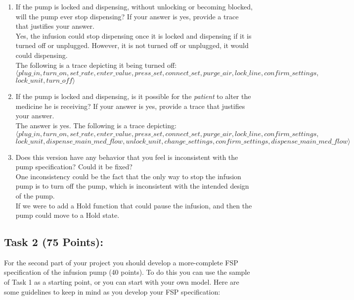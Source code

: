 \documentclass{article}
\newcommand{\head}{\subsection*}
\begin{document}
\begin{enumerate}
  
\item If the pump is locked and dispensing, without unlocking or becoming blocked, will the pump ever stop dispensing? If your answer is yes, provide a trace that justifies your answer. \\
Yes, the infusion could stop dispensing once it is locked and dispensing if it is turned off or unplugged. However, it is not turned off or unplugged, it would could dispensing.\\
The following is a trace depicting it being turned off:\\

$\langle plug\_in, turn\_on, set\_rate, enter\_value, press\_set, connect\_set, purge\_air, lock\_line, confirm\_settings,$\\
$lock\_unit, turn\_off \rangle$
  
\item If the pump is locked and dispensing, is it possible for the \emph{patient} to alter the medicine he is receiving? If your answer is yes, provide a trace that justifies your answer.\\
The answer is yes. The following is a trace depicting: \\
$\langle plug\_in, turn\_on, set\_rate, enter\_value, press\_set, connect\_set, purge\_air, lock\_line, confirm\_settings,$\\ $lock\_unit, dispense\_main\_med\_flow, unlock\_unit, change\_settings, confirm\_settings, dispense\_main\_med\_flow \rangle$
  
\item Does this version have any behavior that you feel is inconsistent with the pump specification? Could it be fixed? \\  
One inconsistency could be the fact that the only way to stop the infusion pump is to turn off the pump, which is inconsistent with the intended design of the pump.
\\
If we were to add a Hold function that could pause the infusion, and then the pump could move to a Hold state.\\

\end{enumerate}

\head{Task 2 (75 Points):}

For the second part of your project you should develop a
more-complete FSP specification of the infusion pump (40 points). To
do this you can use the sample of Task 1 as a starting point, or you
can start with your own model. Here are some guidelines to keep in
mind as you develop your FSP specification:
\end{document}
